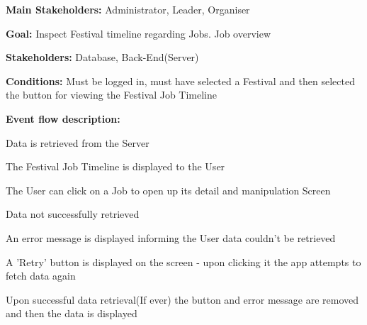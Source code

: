 			\noindent {}
			\begin{packed_item}
				\item \textbf{Main Stakeholders:} Administrator, Leader, Organiser
				\item \textbf{Goal:} Inspect Festival timeline regarding Jobs. Job overview
				\item \textbf{Stakeholders: } Database, Back-End(Server)
				\item \textbf{Conditions: } Must be logged in, must have selected a Festival and then selected the button for viewing the Festival Job Timeline
				\item \textbf{Event flow description: }
				\begin{packed_enum}
					\item Data is retrieved from the Server
					\item The Festival Job Timeline is displayed to the User
					\item The User can click on a Job to open up its detail and manipulation Screen
				\end{packed_enum}
				
				\begin{packed_item}
					\item[1.a] Data not successfully retrieved
					\item[] \begin{packed_enum}
						\item An error message is displayed informing the User data couldn't be retrieved
						\item A 'Retry' button is displayed on the screen - upon clicking it the app attempts to fetch data again
						\item Upon successful data retrieval(If ever) the button and error message are removed and then the data is displayed
					\end{packed_enum}
				\end{packed_item}
			\end{packed_item}
		
